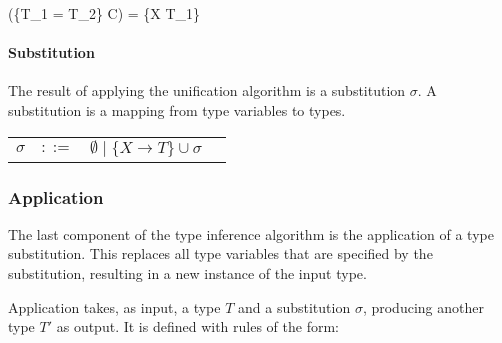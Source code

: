 \documentclass[class=article, crop=false]{standalone}
\begin{document}
  {\gamma \vdash {}(\{T_1 = T_2\} \cup C) = \{X \rightarrow T_1\} \cup \sigma}



\paragraph{Substitution}

The result of applying the unification algorithm is a substitution $\sigma$.
A substitution is a mapping from type variables to types.

\medskip

{\setlength\tabcolsep{8pt}
\begin{tabular}{>{$}l<{$}>{$}r<{$}>{$}l<{$}>{$}r<{$}}
\sigma &::=  & \emptyset \; | \; \{X \rightarrow T\} \cup \sigma\\
\end{tabular}}

\subsubsection{Application}\label{Application}

The last component of the type inference algorithm is the application of a type substitution.
This replaces all type variables that are specified by the substitution, resulting in a new instance of the input type.

Application takes, as input, a type $T$ and a substitution $\sigma$, producing another type $T'$ as output.
It is defined with rules of the form:

\end{document}
